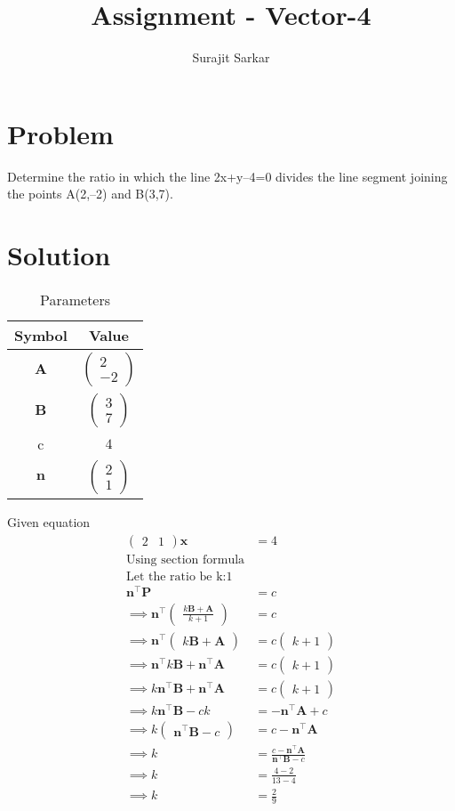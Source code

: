\documentclass[journal,12pt,twocolumn]{IEEEtran}
\title{\mytitle}
\title{
Assignment - Vector-4
}
\author{Surajit Sarkar}
\newcommand{\myvec}[1]{\ensuremath{\begin{pmatrix}#1\end{pmatrix}}}
\let\vec\mathbf
\begin{document}
\maketitle
\bigskip
\section{\textbf{Problem}}
Determine the ratio in which the line 2x+y–4=0 divides the line segment joining the points A(2,–2) and B(3,7).
\section{\textbf{Solution}}
\begin{table}[h]
    \centering
    \begin{tabular}{|c|c|}
       \hline
       \textbf{Symbol}&\textbf{Value}  \\
       \hline
	    $\vec{A}$ & $\myvec{2\\-2}$\\
        \hline
	    $\vec{B}$ & $\myvec{3\\7}$\\
        \hline
	    c&$4$\\
        \hline
       $\vec{n}$ & $\myvec{2\\1}$\\
       \hline
    \end{tabular}
    \caption{Parameters}
    \label{tab:my_label}
\end{table}
Given equation
\begin{align}
    \myvec{2&1}\vec{x}&=4\\
    \text{Using section formula}\\
    \text{Let the ratio be k:1}\\
    \vec{n}^{\top}\vec{P}&=c\\
    \implies\vec{n}^{\top}\myvec{\frac{k\vec{B+A}}{k+1}}&=c\\
    \implies\vec{n}^{\top}\myvec{k\vec{B+A}}&=c\myvec{k+1}\\
    \implies\vec{n}^{\top}k\vec{B}+\vec{n}^{\top}\vec{A}&=c\myvec{k+1}\\
    \implies k\vec{n}^{\top}\vec{B}+\vec{n}^{\top}\vec{A}&=c\myvec{k+1}\\
    \implies k\vec{n}^{\top}\vec{B}-ck&=-\vec{n}^{\top}\vec{A}+c\\
    \implies k\myvec{\vec{n}^{\top}\vec{B}-c}&=c-\vec{n}^{\top}\vec{A}\\
    \implies k&=\frac{c-\vec{n}^{\top}\vec{A}}{\vec{n}^{\top}\vec{B}-c}\\
    \implies k&=\frac{4-2}{13-4}\\
    \implies k&=\frac{2}{9}
\end{align}
\end{document}
